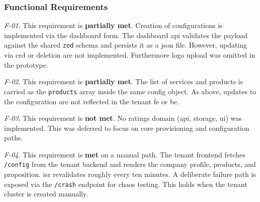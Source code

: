 \documentclass[11pt, a4paper, oneside, listof=totoc]{scrartcl}
\begin{document}
            \subsubsection{Functional Requirements}\label{subsubsec:evalFunctionalRequirements}
                \begin{enumerate}[label={[\arabic*]:},
                    ref=Challenge~\arabic*,
                    leftmargin=*,
                    itemsep=0.6\baselineskip]

                    \item\label{chal:evalF01}
                        \textit{F-01}.
                        This requirement is \textbf{partially met}.
                        Creation of configurations is implemented via the dashboard form.
                        The dashboard \gls{api} validates the payload against the shared
                        \texttt{zod} schema and persists it as a \gls{json} file.
                        However, updating via \gls{crd} or deletion are not implemented.
                        Furthermore logo upload was omitted in the prototype.

                    \item\label{chal:evalF02}
                        \textit{F-02}.
                        This requirement is \textbf{partially met}.
                        The list of services and products is carried as the \texttt{products} array
                        inside the same config object.
                        As above, updates to the configuration are not reflected in the tenant
                        \gls{fe} or \gls{be}.

                    \item\label{chal:evalF03}
                        \textit{F-03}.
                        This requirement is \textbf{not met}.
                        No ratings domain (\gls{api}, storage, \gls{ui}) was implemented.
                        This was deferred to focus on core provisioning and configuration paths.

                    \item\label{chal:evalF04}
                        \textit{F-04}.
                        This requirement is \textbf{met} on a manual path.
                        The tenant frontend fetches \texttt{/config} from the tenant backend and
                        renders the company profile, products, and proposition.
                        \gls{isr} revalidates roughly every ten minutes.
                        A deliberate failure path is exposed via the \texttt{/crash} endpoint for
                        chaos testing.
                        This holds when the tenant cluster is created manually.


\end{enumerate}
\end{document}

